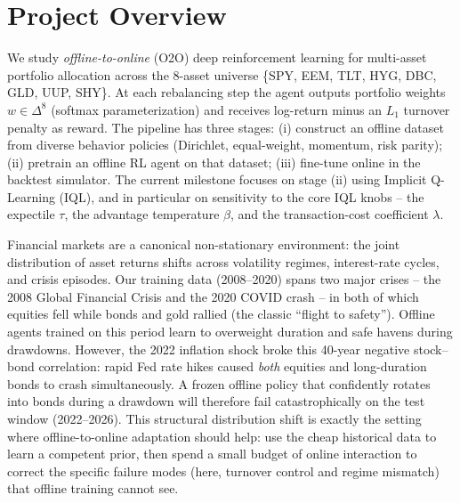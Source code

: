 \section{Project Overview}

We study \emph{offline-to-online} (O2O) deep reinforcement learning for
multi-asset portfolio allocation across the 8-asset universe
\{SPY, EEM, TLT, HYG, DBC, GLD, UUP, SHY\}.  At each rebalancing step
the agent outputs portfolio weights $w \in \Delta^{8}$ (softmax
parameterization) and receives log-return minus an $L_1$ turnover penalty
as reward.  The pipeline has three stages: (i) construct an offline
dataset from diverse behavior policies (Dirichlet, equal-weight,
momentum, risk parity); (ii) pretrain an offline RL agent on that
dataset; (iii) fine-tune online in the backtest simulator.  The current
milestone focuses on stage (ii) using Implicit Q-Learning (IQL), and in
particular on sensitivity to the core IQL knobs -- the expectile
$\tau$, the advantage temperature $\beta$, and the transaction-cost
coefficient $\lambda$.

Financial markets are a canonical non-stationary environment: the joint
distribution of asset returns shifts across volatility regimes,
interest-rate cycles, and crisis episodes.  Our training data
(2008--2020) spans two major crises -- the 2008 Global Financial Crisis
and the 2020 COVID crash -- in both of which equities fell while
bonds and gold rallied (the classic ``flight to safety'').  Offline
agents trained on this period learn to overweight duration and safe
havens during drawdowns.  However, the 2022 inflation shock broke this
40-year negative stock--bond correlation: rapid Fed rate hikes caused
\emph{both} equities and long-duration bonds to crash simultaneously.
A frozen offline policy that confidently rotates into bonds during a
drawdown will therefore fail catastrophically on the test window
(2022--2026).  This structural distribution shift is exactly the setting
where offline-to-online adaptation should help: use the cheap historical
data to learn a competent prior, then spend a small budget of online
interaction to correct the specific failure modes (here, turnover
control and regime mismatch) that offline training cannot see.

